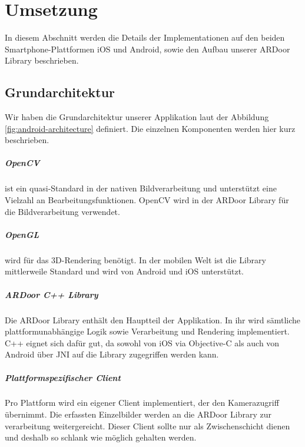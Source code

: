 \chapter{Umsetzung}

In diesem Abschnitt werden die Details der Implementationen auf den beiden Smartphone-Plattformen iOS und Android, sowie den Aufbau unserer ARDoor Library beschrieben.

\section{Grundarchitektur}
Wir haben die Grundarchitektur unserer Applikation laut der Abbildung \ref{fig:android-architecture} definiert. Die einzelnen Komponenten werden hier kurz beschrieben.

\paragraph{OpenCV}
ist ein quasi-Standard in der nativen Bildverarbeitung und unterstützt eine Vielzahl an Bearbeitungsfunktionen. OpenCV wird in der ARDoor Library für die Bildverarbeitung verwendet.

\paragraph{OpenGL}
wird für das 3D-Rendering benötigt. In der mobilen Welt ist die Library mittlerweile Standard und wird von Android und iOS unterstützt.

\paragraph{ARDoor C++ Library}
Die ARDoor Library enthält den Hauptteil der Applikation. In ihr wird sämtliche plattformunabhängige Logik sowie Verarbeitung und Rendering implementiert. C++ eignet sich  dafür gut, da sowohl von iOS via Objective-C als auch von Android über JNI auf die Library zugegriffen werden kann.

\paragraph{Plattformspezifischer Client}
Pro Plattform wird ein eigener Client implementiert, der den Kamerazugriff übernimmt. Die erfassten Einzelbilder werden an die ARDoor Library zur verarbeitung weitergereicht. Dieser Client sollte nur als Zwischenschicht dienen und deshalb so schlank wie möglich gehalten werden. 


